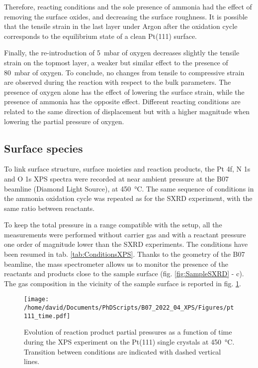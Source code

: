 Therefore, reacting conditions and the sole presence of ammonia had the effect of removing the surface oxides, and decreasing the surface roughness.
It is possible that the tensile strain in the last layer under Argon after the oxidation cycle corresponds to the equilibrium state of a clean Pt(111) surface.

Finally, the re-introduction of \qty{5}{\milli\bar} of oxygen decreases slightly the tensile strain on the topmost layer, a weaker but similar effect to the presence of \qty{80}{\milli\bar} of oxygen.
To conclude, no changes from tensile to compressive strain are observed during the reaction with respect to the bulk parameters.
The presence of oxygen alone has the effect of lowering the surface strain, while the presence of ammonia has the opposite effect.
Different reacting conditions are related to the same direction of displacement but with a higher magnitude when lowering the partial pressure of oxygen.

\subsection{Surface species}

To link surface structure, surface moieties and reaction products, the Pt 4f, N 1s and O 1s XPS spectra were recorded at near ambient pressure at the B07 beamline (Diamond Light Source), at \qty{450}{\degreeCelsius}.
The same sequence of conditions in the ammonia oxidation cycle was repeated as for the SXRD experiment, with the same ratio between reactants.

To keep the total pressure in a range compatible with the setup, all the measurements were performed without carrier gas and with a reactant pressure one order of magnitude lower than the SXRD experiments.
The conditions have been resumed in tab. \ref{tab:ConditionsXPS}.
Thanks to the geometry of the B07 beamline, the mass spectrometer allows us to monitor the presence of the reactants and products close to the sample surface (fig. \ref{fig:SampleSXRD} - c).
The gas composition in the vicinity of the sample surface is reported in fig. \ref{fig:XPS111RGA}.

\begin{figure}[!htb]
    \centering
    \texttt{[image: /home/david/Documents/PhDScripts/B07\_2022\_04\_XPS/Figures/pt111\_time.pdf]}
    \caption{
        Evolution of reaction product partial pressures as a function of time during the XPS experiment on the Pt(111) single crystals at \qty{450}{\degreeCelsius}.
        Transition between conditions are indicated with dashed vertical lines.
    }
    \label{fig:XPS111RGA}
\end{figure}


